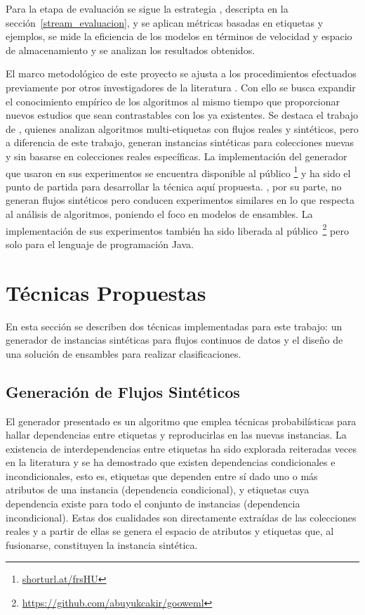 Para la etapa de evaluación se sigue la estrategia
, descripta en la
sección~\ref{stream_evaluacion}, y se aplican métricas basadas en etiquetas y
ejemplos, se mide la eficiencia de los modelos en términos de velocidad y
espacio de almacenamiento y se analizan los resultados obtenidos.

El marco metodológico de este proyecto se ajusta a los procedimientos efectuados
previamente por otros investigadores de la literatura
\cite{osojnik_multi-label_2017, sousa_multi-label_2018, buyukcakir_novel_2018,
	zheng_survey_2020, read_scalable_2012}. Con ello se busca expandir el
conocimiento empírico de los algoritmos al mismo tiempo que proporcionar nuevos
estudios que sean contrastables con los ya existentes.  Se destaca el trabajo de
\citeauthor{read_scalable_2012} \cite{read_scalable_2012}, quienes analizan
algoritmos multi-etiquetas con flujos reales y sintéticos, pero a diferencia de
este trabajo, generan instancias sintéticas para colecciones nuevas y sin
basarse en colecciones reales específicas. La implementación del generador que
usaron en sus experimentos se encuentra disponible al público
\footnote{\url{shorturl.at/frsHU}} y ha sido el punto de partida para
desarrollar la técnica aquí propuesta.  \citeauthor{buyukcakir_novel_2018}, por
su parte, no generan flujos sintéticos pero conducen experimentos similares en
lo que respecta al análisis de algoritmos, poniendo el foco en modelos de
ensambles.  La implementación de sus experimentos también ha sido liberada al
público~\footnote{\url{https://github.com/abuyukcakir/gooweml}} pero solo para
el lenguaje de programación Java.


\section{Técnicas Propuestas}

En esta sección se describen dos técnicas implementadas para este trabajo: un
generador de instancias sintéticas para flujos continuos de datos y el diseño de
una solución de ensambles para realizar clasificaciones.

\subsection{Generación de Flujos Sintéticos}

El generador presentado es un algoritmo que emplea técnicas probabilísticas para
hallar dependencias entre etiquetas y reproducirlas en las nuevas instancias. La
existencia de interdependencias entre etiquetas ha sido explorada reiteradas
veces en la literatura \cite{tsoumakas_multi-label_2007, read_multi-label_2008}
y se ha demostrado que existen dependencias condicionales e incondicionales,
esto es, etiquetas que dependen entre sí dado uno o más atributos de una
instancia (dependencia condicional), y etiquetas cuya dependencia existe para
todo el conjunto de instancias (dependencia incondicional). Estas dos cualidades
son directamente extraídas de las colecciones reales y a partir de ellas se
genera el espacio de atributos y etiquetas que, al fusionarse, constituyen la
instancia sintética.

